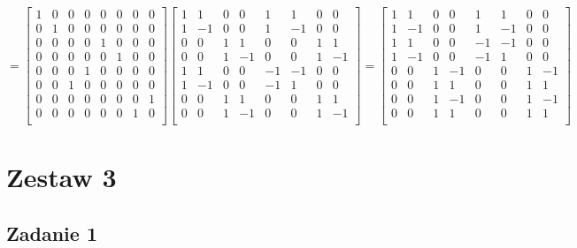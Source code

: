 \documentclass{../notatki}
\begin{document}
$$
=
\begin{bmatrix}
  1 & 0 & 0 & 0 & 0 & 0 & 0 & 0 \\
  0 & 1 & 0 & 0 & 0 & 0 & 0 & 0 \\
  0 & 0 & 0 & 0 & 1 & 0 & 0 & 0 \\
  0 & 0 & 0 & 0 & 0 & 1 & 0 & 0 \\
  0 & 0 & 0 & 1 & 0 & 0 & 0 & 0 \\
  0 & 0 & 1 & 0 & 0 & 0 & 0 & 0 \\
  0 & 0 & 0 & 0 & 0 & 0 & 0 & 1 \\
  0 & 0 & 0 & 0 & 0 & 0 & 1 & 0 \\
\end{bmatrix}
\begin{bmatrix}
  1 & 1 & 0 & 0 & 1 & 1 & 0 & 0 \\
  1 & -1 & 0 & 0 & 1 & -1 & 0 & 0 \\
  0 & 0 & 1 & 1 & 0 & 0 & 1 & 1 \\
  0 & 0 & 1 & -1 & 0 & 0 & 1 & -1 \\
  1 & 1 & 0 & 0 & -1 & -1 & 0 & 0 \\
  1 & -1 & 0 & 0 & -1 & 1 & 0 & 0 \\
  0 & 0 & 1 & 1 & 0 & 0 & 1 & 1 \\
  0 & 0 & 1 & -1 & 0 & 0 & 1 & -1 \\
\end{bmatrix}
=
\begin{bmatrix}
  1 & 1 & 0 & 0 & 1 & 1 & 0 & 0 \\
  1 & -1 & 0 & 0 & 1 & -1 & 0 & 0 \\
  1 & 1 & 0 & 0 & -1 & -1 & 0 & 0 \\
  1 & -1 & 0 & 0 & -1 & 1 & 0 & 0 \\
  0 & 0 & 1 & -1 & 0 & 0 & 1 & -1 \\
  0 & 0 & 1 & 1 & 0 & 0 & 1 & 1 \\
  0 & 0 & 1 & -1 & 0 & 0 & 1 & -1 \\
  0 & 0 & 1 & 1 & 0 & 0 & 1 & 1 \\
\end{bmatrix}
$$

\section{Zestaw 3}

\subsection{Zadanie 1}
\end{document}
